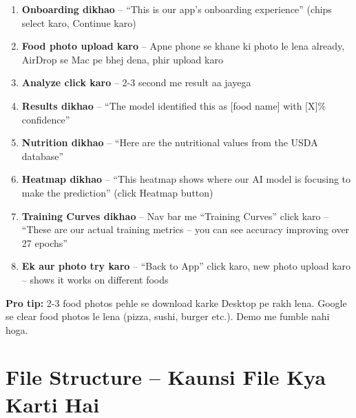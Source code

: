 \documentclass[11pt,a4paper]{article}
\begin{document}
\begin{enumerate}[leftmargin=1.2cm]
\item \textbf{Onboarding dikhao} -- ``This is our app's onboarding experience'' (chips select karo, Continue karo)
\item \textbf{Food photo upload karo} -- Apne phone se khane ki photo le lena already, AirDrop se Mac pe bhej dena, phir upload karo
\item \textbf{Analyze click karo} -- 2-3 second me result aa jayega
\item \textbf{Results dikhao} -- ``The model identified this as [food name] with [X]\% confidence''
\item \textbf{Nutrition dikhao} -- ``Here are the nutritional values from the USDA database''
\item \textbf{Heatmap dikhao} -- ``This heatmap shows where our AI model is focusing to make the prediction'' (click Heatmap button)
\item \textbf{Training Curves dikhao} -- Nav bar me ``Training Curves'' click karo -- ``These are our actual training metrics -- you can see accuracy improving over 27 epochs''
\item \textbf{Ek aur photo try karo} -- ``Back to App'' click karo, new photo upload karo -- shows it works on different foods
\end{enumerate}

\begin{tipbox}
\textbf{Pro tip:} 2-3 food photos pehle se download karke Desktop pe rakh lena. Google se clear food photos le lena (pizza, sushi, burger etc.). Demo me fumble nahi hoga.
\end{tipbox}

\section{File Structure -- Kaunsi File Kya Karti Hai}
\end{document}
